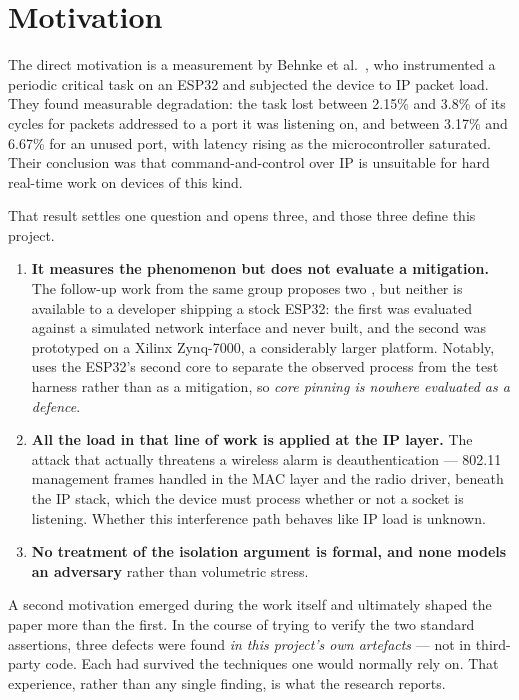 \section{Motivation}

The direct motivation is a measurement by Behnke et al.\ \cite{behnke2020}, who instrumented a
periodic critical task on an ESP32 and subjected the device to IP packet load. They found
measurable degradation: the task lost between 2.15\% and 3.8\% of its cycles for packets
addressed to a port it was listening on, and between 3.17\% and 6.67\% for an unused port, with
latency rising as the microcontroller saturated. Their conclusion was that command-and-control
over IP is unsuitable for hard real-time work on devices of this kind.

That result settles one question and opens three, and those three define this project.

\begin{enumerate}[leftmargin=1.6em,itemsep=4pt]
  \item \textbf{It measures the phenomenon but does not evaluate a mitigation.} The follow-up
        work from the same group proposes two \cite{behnke2022,behnke2023}, but neither is
        available to a developer shipping a stock ESP32: the first was evaluated against a
        simulated network interface and never built, and the second was prototyped on a Xilinx
        Zynq-7000, a considerably larger platform. Notably, \cite{behnke2023} uses the ESP32's
        second core to separate the observed process from the test harness rather than as a
        mitigation, so \emph{core pinning is nowhere evaluated as a defence}.
  \item \textbf{All the load in that line of work is applied at the IP layer.} The attack that
        actually threatens a wireless alarm is deauthentication — 802.11 management frames
        handled in the MAC layer and the radio driver, beneath the IP stack, which the device
        must process whether or not a socket is listening. Whether this interference path
        behaves like IP load is unknown.
  \item \textbf{No treatment of the isolation argument is formal, and none models an
        adversary} rather than volumetric stress.
\end{enumerate}

A second motivation emerged during the work itself and ultimately shaped the paper more than
the first. In the course of trying to verify the two standard assertions, three defects were
found \emph{in this project's own artefacts} — not in third-party code. Each had survived the
techniques one would normally rely on. That experience, rather than any single finding, is what
the research reports.

